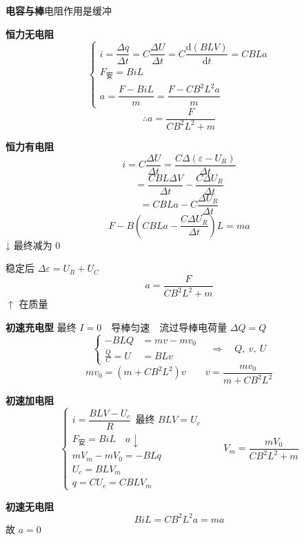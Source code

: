 \textbf{电容与棒}\quad 电阻作用是缓冲

\textbf{恒力无电阻} %
\[ \left\{\begin{array}{l}
i=\dfrac{\Delta q}{\Delta t}=C\dfrac{\Delta U}{\Delta t}=C\dfrac{\mathrm{d}(BLV)}{\mathrm{d}t}=CBLa\\[2.5ex]
F_{\text{安}}=BiL\\[1ex]
a=\dfrac{F-BiL}{m}=\dfrac{F-CB^2L^2a}{m}
\end{array}\right. \]
\[ \therefore a=\frac{F}{CB^2L^2+m} \]

\textbf{恒力有电阻} %
\[ i=C\frac{\Delta U}{\Delta t}=\frac{C\Delta(\varepsilon-U_R)}{\Delta t} \]
\[ =\frac{CBL\Delta V}{\Delta t}-\frac{C\Delta U_R}{\Delta t} \]
\[ =CBLa-C\frac{\Delta U_R}{\Delta t} \]
\[ F-B\left(CBLa-\frac{C\Delta U_R}{\Delta t}\right)L=ma \]
↓ 最终减为 0 %

稳定后 $\Delta\varepsilon=U_R+U_C$
\[ a=\frac{F}{CB^2L^2+m} \]
$\uparrow$ 在质量

\textbf{初速充电型}
最终 $I=0$　导棒匀速　流过导棒电荷量 $\Delta Q=Q$
\[
\left\{\begin{aligned}
-BLQ&=mv-mv_0\\
\frac{Q}{C}=U&=BLv
\end{aligned}\right.
\quad\Rightarrow\quad Q,\ v,\ U
\]
\[
mv_0=(m+CB^2L^2)v\qquad v=\frac{mv_0}{m+CB^2L^2}
\]

\textbf{初速加电阻} %
\[ \left\{\begin{array}{l}
i=\dfrac{BLV-U_c}{R}\ \ \text{最终 }BLV=U_c\\[2.5ex]
F_{\text{安}}=BiL\quad a\downarrow\\[1ex]
mV_m-mV_0=-BLq\\[1ex]
U_c=BLV_m\\[1ex]
q=CU_c=CBLV_m
\end{array}\right.\qquad V_m=\frac{mV_0}{CB^2L^2+m} \]

\textbf{初速无电阻} %
\[ BiL=CB^2L^2a=ma \]
故 $a=0$

